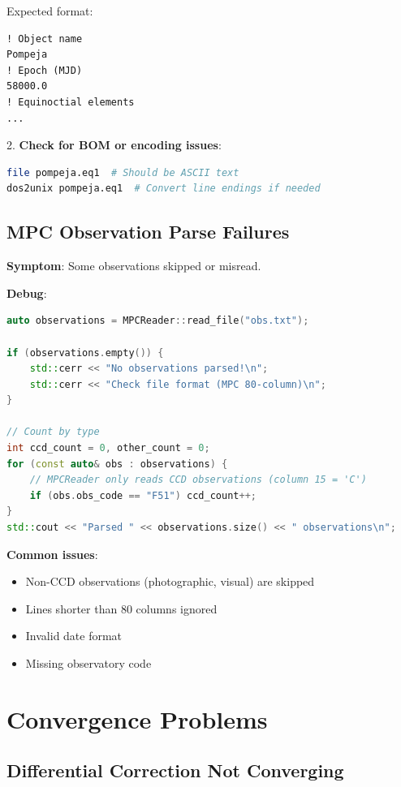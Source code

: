 Expected format:
\begin{verbatim}
! Object name
Pompeja
! Epoch (MJD)
58000.0
! Equinoctial elements
...
\end{verbatim}

2. \textbf{Check for BOM or encoding issues}:
\begin{lstlisting}[language=bash]
file pompeja.eq1  # Should be ASCII text
dos2unix pompeja.eq1  # Convert line endings if needed
\end{lstlisting}

\subsection{MPC Observation Parse Failures}

\textbf{Symptom}: Some observations skipped or misread.

\textbf{Debug}:
\begin{lstlisting}[language=C++]
auto observations = MPCReader::read_file("obs.txt");

if (observations.empty()) {
    std::cerr << "No observations parsed!\n";
    std::cerr << "Check file format (MPC 80-column)\n";
}

// Count by type
int ccd_count = 0, other_count = 0;
for (const auto& obs : observations) {
    // MPCReader only reads CCD observations (column 15 = 'C')
    if (obs.obs_code == "F51") ccd_count++;
}
std::cout << "Parsed " << observations.size() << " observations\n";
\end{lstlisting}

\textbf{Common issues}:
\begin{itemize}
    \item Non-CCD observations (photographic, visual) are skipped
    \item Lines shorter than 80 columns ignored
    \item Invalid date format
    \item Missing observatory code
\end{itemize}

\section{Convergence Problems}

\subsection{Differential Correction Not Converging}

